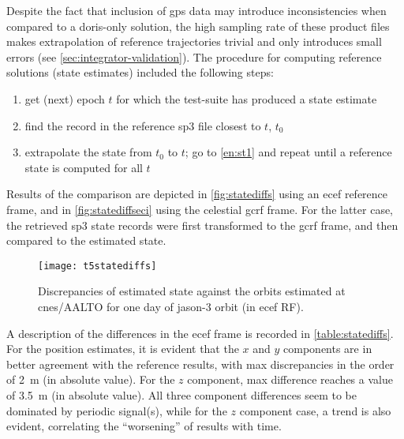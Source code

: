 Despite the fact that inclusion of \gls{gps} data may introduce inconsistencies 
when compared to a \gls{doris}-only solution, the high sampling rate of these 
product files makes extrapolation of reference trajectories trivial and only introduces 
small errors (see \autoref{sec:integrator-validation}). The procedure for computing 
reference solutions (state estimates) included the following steps:
\begin{enumerate}
  \item \label{en:st1} get (next) epoch $t$ for which the test-suite has produced a state estimate
  \item find the record in the reference sp3 file closest to $t$, $t_0$
  \item extrapolate the state from $t_0$ to $t$; go to \autoref{en:st1} and repeat 
    until a reference state is computed for all $t$
\end{enumerate}

Results of the comparison are depicted in \autoref{fig:statediffs} using an \gls{ecef} 
reference frame, and in \autoref{fig:statediffseci} using the celestial \gls{gcrf} 
frame. For the latter case, the retrieved sp3 state records were first transformed to 
the \gls{gcrf} frame, and then compared to the estimated state.

\begin{figure}[ht]
    \centering
    \texttt{[image: t5statediffs]}
    \caption{Discrepancies of estimated state against the orbits estimated at \gls{cnes}/AALTO for one day of \gls{jason}-3 orbit (in \gls{ecef} RF).}
    \label{fig:statediffs}
\end{figure}

A description of the differences in the \gls{ecef} frame is recorded in 
\autoref{table:statediffs}. For the position estimates, it is evident that the $x$ 
and $y$ components are in better 
agreement with the reference results, with max discrepancies in the order of 
\SI{2}{\metre} (in absolute value). For the $z$ component, max difference reaches 
a value of \SI{3.5}{\metre} (in absolute value). All three component differences 
seem to be dominated by periodic signal(s), while for the $z$ component case, 
a trend is also evident, correlating the ``worsening'' of results with time.

